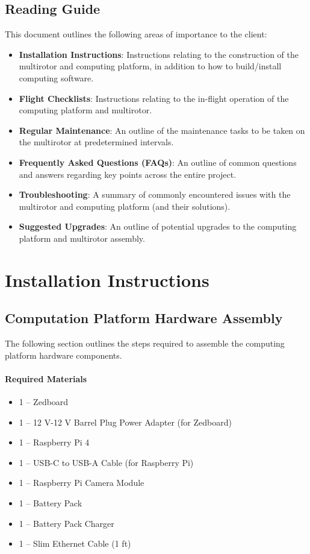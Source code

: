 \documentclass[10pt,letterpaper]{article}
\begin{document}
\subsection{Reading Guide}
This document outlines the following areas of importance to the client: 
\begin{itemize}
\item \textbf{Installation Instructions}: Instructions relating to the construction of the multirotor and computing platform, in addition to how to build/install computing software.
\item \textbf{Flight Checklists}: Instructions relating to the in-flight operation of the computing platform and multirotor.
\item \textbf{Regular Maintenance}: An outline of the maintenance tasks to be taken on the multirotor at predetermined intervals.
\item \textbf{Frequently Asked Questions (FAQs)}: An outline of common questions and answers regarding key points across the entire project.
\item \textbf{Troubleshooting}: A summary of commonly encountered issues with the multirotor and computing platform (and their solutions).
\item \textbf{Suggested Upgrades}: An outline of potential upgrades to the computing platform and multirotor assembly.
\end{itemize}

\clearpage
\section{Installation Instructions}

\subsection{Computation Platform Hardware Assembly}
The following section outlines the steps required to assemble the computing platform hardware components.

\paragraph{Required Materials}
\begin{itemize}
\item 1 -- Zedboard
\item 1 -- 12 V-12 V Barrel Plug Power Adapter (for Zedboard)
\item 1 -- Raspberry Pi 4
\item 1 -- USB-C to USB-A Cable (for Raspberry Pi)
\item 1 -- Raspberry Pi Camera Module
\item 1 -- Battery Pack
\item 1 -- Battery Pack Charger
\item 1 -- Slim Ethernet Cable (1 ft)
\end{itemize}
\end{document}

